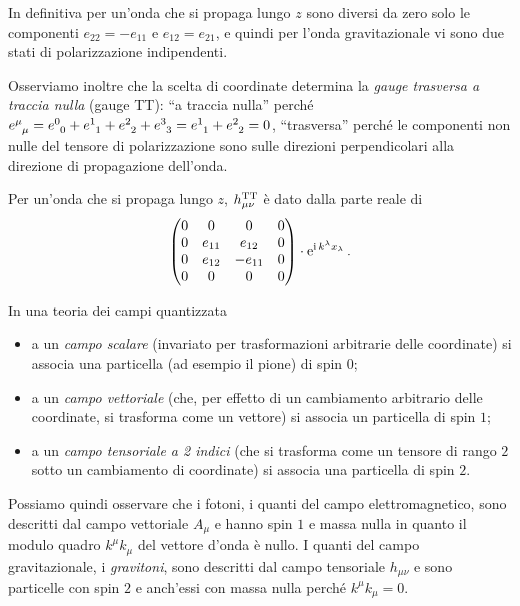 In definitiva per un'onda che si propaga lungo $z$ sono diversi da zero solo le
componenti $e_{22} = -e_{11}$ e $e_{12} = e_{21}$, e quindi per l'onda
gravitazionale vi sono due stati di polarizzazione indipendenti.

Osserviamo inoltre che la scelta di coordinate determina la
\emph{gauge trasversa a traccia nulla}
(gauge TT): ``a traccia nulla'' perché $\tensor{e}{^{\mu}_{\mu}} =
\tensor{e}{^{0}_{0}} + \tensor{e}{^{1}_{1}} + \tensor{e}{^{2}_{2}} +
\tensor{e}{^{3}_{3}} = \tensor{e}{^{1}_{1}} + \tensor{e}{^{2}_{2}} = 0$,
``trasversa'' perché le componenti non nulle del tensore di polarizzazione sono
sulle direzioni perpendicolari alla direzione di propagazione dell'onda.

Per un'onda che si propaga lungo $z$, $h_{\mu\nu}^{\textup{TT}}$ è dato dalla
parte reale di
\begin{equation}
  \begin{pmatrix}
    0 & 0      & 0       & 0 \\
    0 & e_{11} & e_{12}  & 0 \\
    0 & e_{12} & -e_{11} & 0 \\
    0 & 0      & 0       & 0
  \end{pmatrix}\cdot \operatorname{\mathrm{e}}^{\operatorname{\mathrm{i}} k^{\lambda}x_{\lambda}}.
\end{equation}

In una teoria dei campi quantizzata
\begin{itemize}
\item a un \emph{campo scalare} (invariato per trasformazioni arbitrarie delle
  coordinate) si associa una particella (ad esempio il pione) di spin $0$;
\item a un \emph{campo vettoriale} (che, per effetto di un cambiamento
  arbitrario delle coordinate, si trasforma come un vettore) si associa un
  particella di spin $1$;
\item a un \emph{campo tensoriale a 2 indici} (che si trasforma come un tensore
  di rango $2$ sotto un cambiamento di coordinate) si associa una particella di
  spin $2$.
\end{itemize}
Possiamo quindi osservare che i fotoni, i quanti del campo elettromagnetico,
sono descritti dal campo vettoriale $A_{\mu}$ e hanno spin $1$ e massa nulla in
quanto il modulo quadro $k^{\mu}k_{\mu}$ del vettore d'onda è nullo.  I quanti
del campo gravitazionale, i \emph{gravitoni}, sono descritti
dal campo tensoriale $h_{\mu\nu}$ e sono particelle con spin $2$ e anch'essi con
massa nulla perché $k^{\mu}k_{\mu} = 0$.

